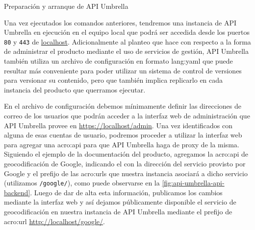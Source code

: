 \begin{listing}[H]
  \caption{Preparación y arranque de API Umbrella}
  \label{soa:tecnologias:api-umbrella:bash-preparacion}
\end{listing}

Una vez ejecutados los comandos anteriores, tendremos una instancia de API Umbrella en ejecución en el equipo local que podrá ser accedida desde los puertos \texttt{80} y \texttt{443} de \url{localhost}. Adicionalmente al planteo que  hace con respecto a la forma de administrar el producto mediante el uso de servicios de gestión, API Umbrella también utiliza un archivo de configuración en formato \gls{lang:yaml} que puede resultar más conveniente para poder utilizar un sistema de control de versiones para versionar su contenido, pero que también implica replicarlo en cada instancia del producto que querramos ejecutar.

En el archivo de configuración debemos mínimamente definir las direcciones de correo de los usuarios que podrán acceder a la interfaz web de administración que API Umbrella provee en \url{https://localhost/admin}. Una vez identificados con alguna de esas cuentas de usuario, podremos proceder a utilizar la interfaz web para agregar una \gls{acro:api} para que API Umbrella haga de proxy de la misma. Siguiendo el ejemplo de la documentación del producto, agregamos la \gls{acro:api} de geocodificación de Google, indicando el  con la dirección del servicio provisto por Google y el prefijo de las \glspl{acro:url} que nuestra instancia asociará a dicho servicio (utilizamos \texttt{/google/}), como puede observarse en la \autoref{fig:api-umbrella-api-backend}. Luego de dar de alta esta información, publicamos los cambios mediante la interfaz web y así dejamos públicamente disponible el servicio de geocodificación en nuestra instancia de API Umbrella mediante el prefijo de \gls{acro:url} \url{http://localhost/google/}.

